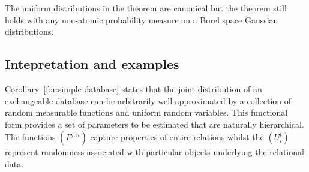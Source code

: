 %

\begin{rem}\label{rem:uniform}
The uniform distributions in the theorem are canonical but the theorem still holds with any non-atomic probability measure on a Borel space \eg Gaussian distributions.
\end{rem}

\begin{rem}\label{rem:randfunc}
\end{rem}

\subsection{Intepretation and examples}

Corollary~\ref{for:simple-database} states that the joint distribution of an exchangeable database can be arbitrarily well approximated by a collection of random measurable functions and uniform random variables.
This functional form provides a set of parameters to be estimated that are naturally hierarchical.
The functions $(F^{j,n})$ capture properties of entire relations whilst the $(U^t_i)$ represent randomness associated with particular objects underlying the relational data.

